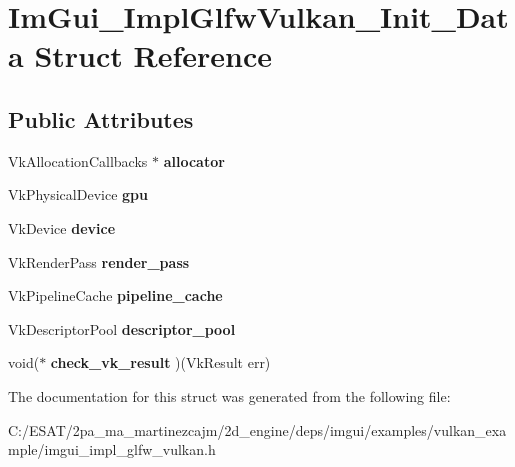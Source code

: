\hypertarget{struct_im_gui___impl_glfw_vulkan___init___data}{}\section{Im\+Gui\+\_\+\+Impl\+Glfw\+Vulkan\+\_\+\+Init\+\_\+\+Data Struct Reference}
\label{struct_im_gui___impl_glfw_vulkan___init___data}
\subsection*{Public Attributes}
\begin{DoxyCompactItemize}
\item 
\mbox{\label{struct_im_gui___impl_glfw_vulkan___init___data_a765f8229e0e3476ccaf4b4b51e13ace8}} 
Vk\+Allocation\+Callbacks $\ast$ {\bfseries allocator}
\item 
\mbox{\label{struct_im_gui___impl_glfw_vulkan___init___data_ae585dd60615c5c34c6dfe6839c0dd880}} 
Vk\+Physical\+Device {\bfseries gpu}
\item 
\mbox{\label{struct_im_gui___impl_glfw_vulkan___init___data_a396d3a4fd7ca586db09d6a08041c1fc0}} 
Vk\+Device {\bfseries device}
\item 
\mbox{\label{struct_im_gui___impl_glfw_vulkan___init___data_a6f358ff30d71551952e798f4bc88c20a}} 
Vk\+Render\+Pass {\bfseries render\+\_\+pass}
\item 
\mbox{\label{struct_im_gui___impl_glfw_vulkan___init___data_a0aee116c84864ab2b3a01d444913a473}} 
Vk\+Pipeline\+Cache {\bfseries pipeline\+\_\+cache}
\item 
\mbox{\label{struct_im_gui___impl_glfw_vulkan___init___data_ab271b06ca0c396bcc1be035f5e641722}} 
Vk\+Descriptor\+Pool {\bfseries descriptor\+\_\+pool}
\item 
\mbox{\label{struct_im_gui___impl_glfw_vulkan___init___data_a25cc63834369e292b39a54da8a48f531}} 
void($\ast$ {\bfseries check\+\_\+vk\+\_\+result} )(Vk\+Result err)
\end{DoxyCompactItemize}


The documentation for this struct was generated from the following file\+:\begin{DoxyCompactItemize}
\item 
C\+:/\+E\+S\+A\+T/2pa\+\_\+ma\+\_\+martinezcajm/2d\+\_\+engine/deps/imgui/examples/vulkan\+\_\+example/imgui\+\_\+impl\+\_\+glfw\+\_\+vulkan.\+h\end{DoxyCompactItemize}
